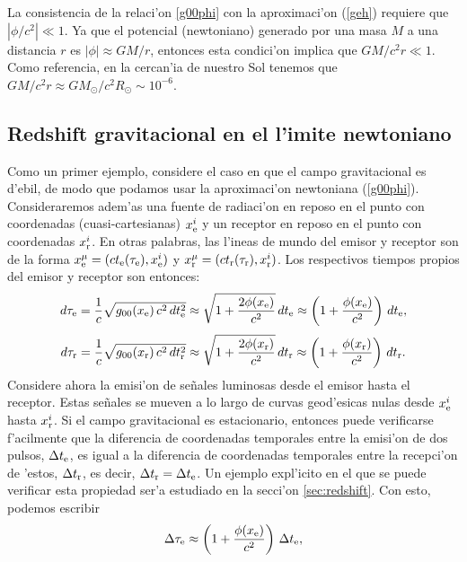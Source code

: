 La consistencia de la relaci'on \eqref{g00phi} con la aproximaci'on (\ref{geh}) requiere que $|{\phi}/{c^2}|\ll 1$. Ya que el potencial (newtoniano) generado por una masa $M$ a una distancia $r$ es $|\phi|\approx {GM}/{r}$, entonces esta condici'on implica que ${GM}/{c^2r}\ll 1$. Como referencia, en la cercan'ia de nuestro Sol tenemos que ${GM}/{c^2r}\approx {GM_\odot}{/c^2R_\odot}\sim 10^{-6}$.


\subsection{Redshift gravitacional en el l'imite newtoniano}\label{zg1}

Como un primer ejemplo, considere el caso en que el campo gravitacional es d'ebil, de modo que podamos usar la aproximaci'on newtoniana (\ref{g00phi}). Consideraremos adem'as una fuente de radiaci'on en reposo en el punto con coordenadas (cuasi-cartesianas) $x^i_{\rm e}$ y un receptor en reposo en el punto con coordenadas $x^i_{\rm r}$. En otras palabras, las l'ineas de mundo del emisor y receptor son de la forma $x^\mu_{\rm e}=(ct_{\rm e}(\tau_{\rm e}),x^i_{\rm e})$ y $x^\mu_{\rm r}=(ct_{\rm r}(\tau_{\rm r}),x^i_{\rm r})$. Los respectivos tiempos propios del emisor y receptor son entonces:
\begin{equation}
 d\tau_{\rm e}=\frac{1}{c}\sqrt{g_{00}(x_{\rm e})\,c^2\,dt^2_{\rm e}}\approx \sqrt{1+\frac{2\phi(x_{\rm e})}{c^2}}\,dt_{\rm e}\approx \left(1+\frac{\phi(x_{\rm e})}{c^2}\right)\,dt_{\rm e},
\end{equation}
\begin{equation}
 d\tau_{\rm r}=\frac{1}{c}\sqrt{g_{00}(x_{\rm r})\,c^2\,dt^2_{\rm r}}\approx \sqrt{1+\frac{2\phi(x_{\rm r})}{c^2}}\,dt_{\rm r}\approx \left(1+\frac{\phi(x_{\rm r})}{c^2}\right)\,dt_{\rm r}.
\end{equation}
Considere ahora la emisi'on de se\~nales luminosas desde el emisor hasta el receptor. Estas se\~nales se mueven a lo largo de curvas geod'esicas nulas desde $x^i_{\rm e}$ hasta $x^i_{\rm r}$. Si el campo gravitacional es estacionario, entonces puede verificarse f'acilmente que la diferencia de coordenadas temporales entre la emisi'on de dos pulsos, $ \Delta t_{\rm e}$, es igual a la diferencia de coordenadas temporales entre la recepci'on de 'estos, $ \Delta t_{\rm r}$, es decir, $ \Delta t_{\rm r}= \Delta t_{\rm e}$. Un ejemplo expl'icito en el que se puede verificar esta propiedad ser'a estudiado en la secci'on \ref{sec:redshift}. Con esto, podemos escribir
\begin{equation}
 \Delta\tau_{\rm e}\approx \left(1+\frac{\phi(x_{\rm e})}{c^2}\right)\, \Delta t_{\rm e},
\end{equation}
